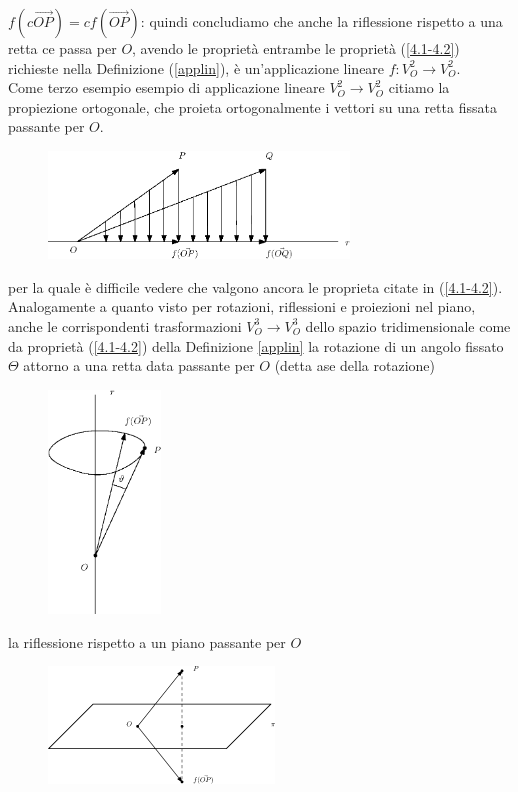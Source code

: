 \begin{definizione}
\begin{esempio}
    $f(c\vec{OP})=cf(\vec{OP})$: quindi concludiamo che anche la riflessione rispetto a una retta ce passa per
    $O$, avendo le proprietà entrambe le proprietà (\ref{4.1-4.2}) richieste nella Definizione (\ref{applin}),
    è un'applicazione lineare $f:V_O^2\to        V_O^2$.\\
    Come terzo esempio esempio di applicazione lineare $V_O^2\to V_O^2$ citiamo la propiezione ortogonale,
    che proieta ortogonalmente i vettori su una retta fissata passante per $O$.
    \begin{figure}[th]
      \centering
        \includegraphics[width=8cm]{img/finiti/imgex4-2-7.eps}
    \end{figure}
      
    per la quale è difficile vedere che valgono ancora le proprieta citate in (\ref{4.1-4.2}).\\
    Analogamente a quanto visto per rotazioni, riflessioni e proiezioni nel piano, anche le corrispondenti
    trasformazioni $V_O^3\to V_O^3$ dello spazio tridimensionale come da proprietà (\ref{4.1-4.2}) della
    Definizione \ref{applin} la rotazione di un angolo fissato $\Theta$ attorno a una retta data passante per $O$
    (detta ase della rotazione)
    \clearpage
    \begin{figure}[th]
      \centering
        \includegraphics[width=3cm]{img/finiti/imgex4-2-8.eps}
    \end{figure}
    la riflessione rispetto a un piano passante per $O$
    \begin{figure}[th]
      \centering
        \includegraphics[width=6cm]{img/finiti/imgex4-2-9.eps}
    \end{figure}
      

\end{esempio}
\end{definizione}
